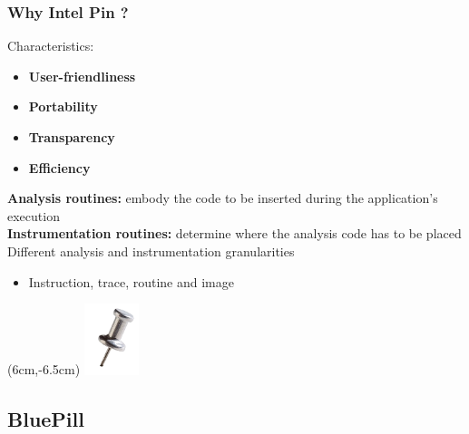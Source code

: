 \documentclass[compress]{beamer}
\begin{document}
\begin{frame}
    \frametitle{Why Intel Pin ?}
    
	Characteristics:
	\begin{itemize}
	\item \textbf{User-friendliness}
	\item \textbf{Portability}
	\item \textbf{Transparency}
	\item \textbf{Efficiency}
	\end{itemize}
	\bigskip
	\textbf{Analysis routines:} embody the code to be inserted during the application's execution\\
	\smallskip
	\textbf{Instrumentation routines:} determine where the analysis code has to be placed\\
	\bigskip
	Different analysis and instrumentation granularities
	\begin{itemize}
	\item Instruction, trace, routine and image
	\end{itemize}
    
    \begin{textblock*}{3cm}(6cm,-6.5cm)
   \includegraphics[width=1.6cm]{image/pin.png}%
	\end{textblock*}
	
	

\end{frame}

\subsection{BluePill}
\end{document}
